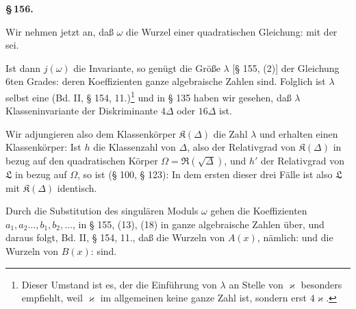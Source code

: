 \begin{center}
\textbf{\S\,156.\qquad {}}
\end{center}

Wir nehmen jetzt an, daß $\omega$ die Wurzel einer quadratischen
Gleichung:
mit der 
sei.

Ist dann $j(\omega)$ die Invariante, so genügt die Größe $\lambda$ [§ 155,
(2)] der Gleichung 6ten Grades:
deren Koeffizienten ganze algebraische Zahlen sind. Folglich ist
$\lambda$ selbst eine  (Bd. II, § 154, 11.)\footnote{Dieser Umstand ist es, der die Einführung von $\lambda$ an Stelle von $\varkappa$ besonders empfiehlt, weil $\varkappa$ im allgemeinen keine ganze Zahl ist, sondern erst $4\varkappa$.}
und in § 135 haben wir gesehen, daß $\lambda$ Klasseninvariante der
Diskriminante $4\Delta$ oder $16\Delta$ ist.

Wir adjungieren also dem Klassenkörper $\mathfrak{K}(\Delta)$ die Zahl $\lambda$
und erhalten einen Klassenkörper:
Ist $h$ die Klassenzahl von $\Delta$, also der Relativgrad von $\mathfrak{K}(\Delta)$
in bezug auf den quadratischen Körper $\Omega = \mathfrak{R}(\sqrt{\Delta})$, und $h'$ der
Relativgrad von $\mathfrak{L}$ in bezug auf $\Omega$, so ist (§ 100, § 123):
In dem ersten dieser drei Fälle ist also $\mathfrak{L}$ mit $\mathfrak{K}(\Delta)$ identisch.

Durch die Substitution des singulären Moduls $\omega$ gehen die
Koeffizienten $a_1, a_2 \ldots, b_1, b_2, \ldots$, in § 155, (13), (18) in ganze
algebraische Zahlen über, und daraus folgt, Bd. II, § 154, 11.,
daß die Wurzeln von $A(x)$, nämlich:
und die Wurzeln von $B(x)$:
sind.
